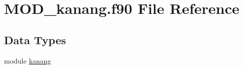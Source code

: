 \hypertarget{MOD__kanang_8f90}{\section{M\-O\-D\-\_\-kanang.\-f90 File Reference}
\label{MOD__kanang_8f90}
}
\subsection*{Data Types}
\begin{DoxyCompactItemize}
\item 
module \hyperlink{classkanang}{kanang}
\end{DoxyCompactItemize}

